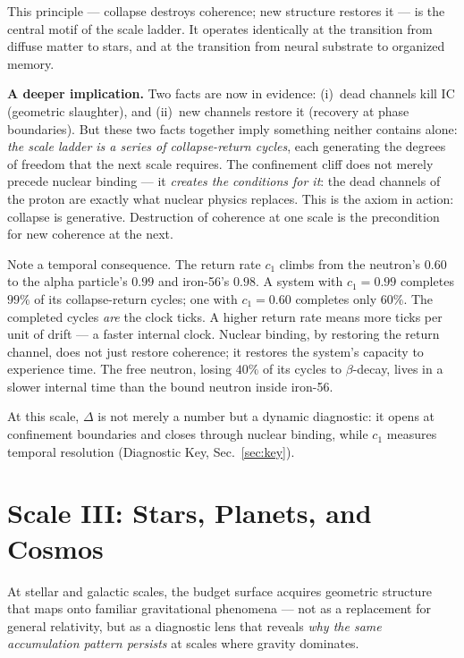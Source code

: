 \documentclass[
  aps,
  prd,
  twocolumn,
  superscriptaddress,
  nofootinbib,
  floatfix
]{revtex4-2}
\newcommand{\IC}{\mathrm{IC}}
\begin{document}
This principle --- collapse destroys coherence;
new structure restores it --- is the central motif of the
scale ladder.  It operates identically at the transition from
diffuse matter to stars, and at the transition from neural
substrate to organized memory.

\textbf{A deeper implication.}
Two facts are now in evidence: (i)~dead channels kill $\IC$
(geometric slaughter), and (ii)~new channels restore it
(recovery at phase boundaries).  But these two facts together
imply something neither contains alone: \emph{the scale ladder
is a series of collapse-return cycles}, each generating
the degrees of freedom that the next scale requires.  The
confinement cliff does not merely precede nuclear binding ---
it \emph{creates the conditions for it}: the dead channels of
the proton are exactly what nuclear physics replaces.  This is
the axiom in action: collapse is generative.  Destruction of
coherence at one scale is the precondition for new coherence
at the next.

Note a temporal consequence.  The return rate $c_1$ climbs
from the neutron's $0.60$ to the alpha particle's $0.99$ and
iron-56's $0.98$.  A system with $c_1 = 0.99$ completes
$99\%$ of its collapse-return cycles; one with $c_1 = 0.60$
completes only $60\%$.  The completed cycles \emph{are}
the clock ticks.  A higher return rate means more ticks per
unit of drift --- a faster internal clock.  Nuclear binding,
by restoring the return channel, does not just restore
coherence; it restores the system's capacity to experience
time.  The free neutron, losing $40\%$ of its cycles to
$\beta$-decay, lives in a slower internal time than the
bound neutron inside iron-56.

At this scale, $\Delta$ is not merely a number but a
dynamic diagnostic: it opens at confinement boundaries and
closes through nuclear binding, while $c_1$ measures
temporal resolution (Diagnostic Key, Sec.~\ref{sec:key}).


\section{Scale III: Stars, Planets, and Cosmos}
\label{sec:cosmos}

At stellar and galactic scales, the budget surface acquires
geometric structure that maps onto familiar gravitational
phenomena --- not as a replacement for general relativity,
but as a diagnostic lens that reveals \emph{why the same
accumulation pattern persists} at scales where gravity
dominates.
\end{document}
